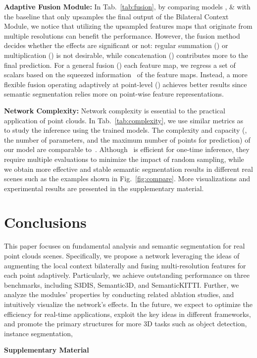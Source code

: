 \documentclass[10pt,twocolumn,letterpaper]{article}
\def\ourencoder{Bilateral Context Module}
\begin{document}
\vspace{1mm}
\noindent \textbf{Adaptive Fusion Module:}
In Tab.~\ref{tab:fusion}, by comparing models , \& with the baseline  that only upsamples the final output of the \ourencoder, we notice that utilizing the upsampled features maps that originate from multiple resolutions can benefit the performance. However, the fusion method decides whether the effects are significant or not: regular summation () or multiplication () is not desirable, while concatenation () contributes more to the final prediction. For a general fusion () \wrt each feature map, we regress a set of scalars  based on the squeezed information~\cite{hu2018squeeze} of the feature maps. Instead, a more flexible fusion operating adaptively at point-level () achieves better results since semantic segmentation relies more on point-wise feature representations.  

\vspace{1mm}
\noindent \textbf{Network Complexity:}
Network complexity is essential to the practical application of point clouds. In Tab.~\ref{tab:complexity}, we use similar metrics as~\cite{hu2020randla} to study the inference using the trained models. The complexity and capacity (\ie, the number of parameters, and the maximum number of points for prediction) of our model are comparable to~\cite{qi2017pointnet++, hu2020randla}. Although \cite{hu2020randla}~is efficient for one-time inference, they require multiple evaluations to minimize the impact of random sampling, while we obtain more effective and stable semantic segmentation results in different real scenes such as the examples shown in Fig.~\ref{fig:compare}. More visualizations and experimental results are presented in the supplementary material. \section{Conclusions}
\label{sec:concl}
This paper focuses on fundamental analysis and semantic segmentation for real point clouds scenes. Specifically, we propose a network leveraging the ideas of augmenting the local context bilaterally and fusing multi-resolution features for each point adaptively. Particularly, we achieve outstanding performance on three benchmarks, including S3DIS, Semantic3D, and SemanticKITTI. Further, we analyze the modules' properties by conducting related ablation studies, and intuitively visualize the network's effects. In the future, we expect to optimize the efficiency for real-time applications, exploit the key ideas in different frameworks, and promote the primary structures for more 3D tasks such as object detection, instance segmentation, \etc 
{\small


}
\clearpage
\appendix
\noindent\textbf{\Large{Supplementary Material}}
\end{document}

